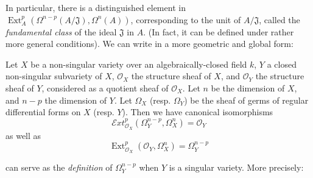 In particular, there is a distinguished element in $\operatorname{Ext}_A^p(\Omega^{n-p}(A/\mathfrak{J}),\Omega^n(A))$, corresponding to the unit of $A/\mathfrak{J}$, called the \emph{fundamental class} of the ideal $\mathfrak{J}$ in $A$.
(In fact, it can be defined under rather more general conditions).
We can write  in a more geometric and global form:


\begin{corollary}\label{fga1-proposition-4-corollary-2}
  Let $X$ be a non-singular variety over an algebraically-closed field $k$, $Y$ a closed non-singular subvariety of $X$, $\mathcal{O}_X$ the structure sheaf of $X$, and $\mathcal{O}_Y$ the structure sheaf of $Y$, considered as a quotient sheaf of $\mathcal{O}_X$.
  Let $n$ be the dimension of $X$, and $n-p$ the dimension of $Y$.
  Let $\Omega_X$ (resp. $\Omega_Y$) be the sheaf of germs of regular differential forms on $X$ (resp. $Y$).
  Then we have canonical isomorphisms
  \begin{equation}\tag{3.6}\label{fga1-equation-3.6}
    \mathcal{E}xt_{\mathcal{O}_X}^p(\Omega_Y^{n-p},\Omega_X^n) = \mathcal{O}_Y
  \end{equation}
  as well as
  \begin{equation}\tag{3.6 bis}\label{fga1-equation-3.6bis}
    \operatorname{Ext}_{\mathcal{O}_X}^p(\mathcal{O}_Y,\Omega_X^n) = \Omega_Y^{n-p}
  \end{equation}
\end{corollary}


 can serve as the \emph{definition} of $\Omega_Y^{n-p}$ when $Y$ is a singular variety.
More precisely:

